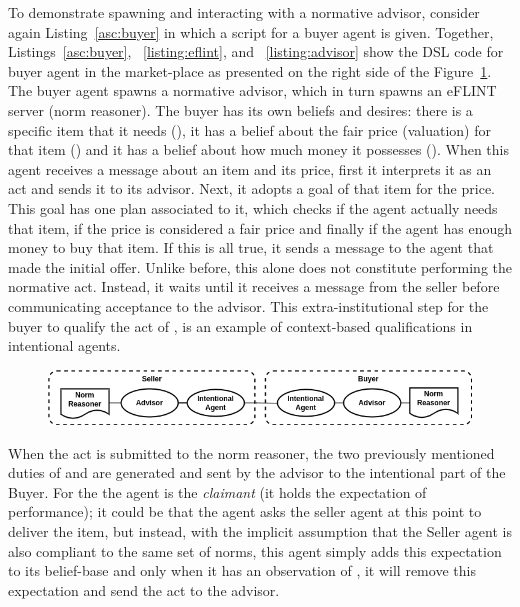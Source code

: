 To demonstrate spawning and interacting with a normative advisor, consider again Listing~\ref{asc:buyer} in which a script for a buyer agent is given.
%
Together, Listings~\ref{asc:buyer}, ~\ref{listing:eflint}, and ~\ref{listing:advisor} show the DSL code for buyer agent in the market-place as presented on the right side of the Figure~\ref{fig:non-gov}.
%
The buyer agent spawns a normative advisor, which in turn spawns an eFLINT server (norm reasoner). 
%
The buyer has its own beliefs and desires: there is a specific item that it needs (), it has a belief about the fair price (valuation) for that item () and it has a belief about how much money it possesses ().
%
When this agent receives a  message about an item and its price, first it interprets it as an  act and sends it to its advisor. Next, it adopts a goal of  that item for the price. This goal has one plan associated to it, which checks if the agent actually needs that item, if the price is considered a fair price and finally if the agent has enough money to buy that item. If this is all true, it sends a  message to the agent that made the initial offer. Unlike before, this alone does not constitute performing the normative  act. Instead, it waits until it receives a  message from the seller before communicating acceptance to the advisor. This extra-institutional step for the buyer to qualify the act of , is an example of context-based qualifications in intentional agents.

\begin{figure}[!tb]
  \centering
  \includegraphics[width=.8\textwidth]{ch_eumas/ad-hoc.drawio.png}
  \label{fig:non-gov}
\end{figure}

When the  act is submitted to the norm reasoner, the two previously mentioned duties of  and  are generated and sent by the advisor to the intentional part of the Buyer. For the  the agent is the \textit{claimant} (it holds the expectation of performance); it could be that the agent asks the seller agent at this point to deliver the item, but instead, with the implicit assumption that the Seller agent is also compliant to the same set of norms, this agent simply adds this expectation to its belief-base and only when it has an observation of , it will remove this expectation and send the  act to the advisor. 

